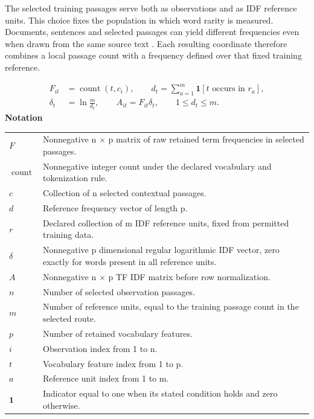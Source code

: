 \documentclass[10pt,letterpaper]{article}
\newcommand{\notlabel}{\noindent\textbf{Notation}\par\nobreak\vspace{4pt}}
\begin{document}
The selected training passages serve both as observations and as IDF reference units. This choice fixes the population in which word rarity is measured. Documents, sentences and selected passages can yield different frequencies even when drawn from the same source text \cite{blake}. Each resulting coordinate therefore combines a local passage count with a frequency defined over that fixed training reference.\par

\par\noindent\begin{minipage}{\linewidth}
\begin{equation}\label{eq:tfidf}
\begin{aligned}F_{it}&=\operatorname{count}(t,c_i),\qquad d_t=\sum_{a=1}^{m}\mathbf1[t\text{ occurs in }r_a],\\\delta_t&=\ln\frac{m}{d_t},\qquad A_{it}=F_{it}\delta_t,\qquad 1\le d_t\le m.\end{aligned}
\end{equation}
\notlabel
{\fontsize{8.5}{10.5}\selectfont\setlength{\tabcolsep}{0pt}\renewcommand{\arraystretch}{1.12}
\begin{tabularx}{\linewidth}{@{}p{.14\linewidth}X@{}}
$F$ & Nonnegative n \ensuremath{\times} p matrix of raw retained term frequencies in selected passages.\\
$\operatorname{count}$ & Nonnegative integer count under the declared vocabulary and tokenization rule.\\
$c$ & Collection of n selected contextual passages.\\
$d$ & Reference frequency vector of length p.\\
$r$ & Declared collection of m IDF reference units, fixed from permitted training data.\\
$\delta$ & Nonnegative p dimensional regular logarithmic IDF vector, zero exactly for words present in all reference units.\\
$A$ & Nonnegative n \ensuremath{\times} p TF IDF matrix before row normalization.\\
$n$ & Number of selected observation passages.\\
$m$ & Number of reference units, equal to the training passage count in the selected route.\\
$p$ & Number of retained vocabulary features.\\
$i$ & Observation index from 1 to n.\\
$t$ & Vocabulary feature index from 1 to p.\\
$a$ & Reference unit index from 1 to m.\\
$\mathbf1$ & Indicator equal to one when its stated condition holds and zero otherwise.\\
\end{tabularx}}
\par\vspace{2pt}
\end{minipage}\par
\end{document}
